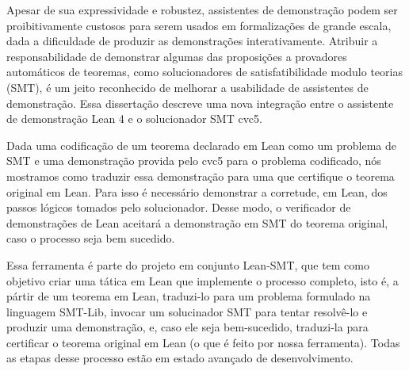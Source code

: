 Apesar de sua expressividade e robustez, assistentes
de demonstra\c{c}\~ao podem ser proibitivamente custosos
para serem usados em formaliza\c{c}\~oes de grande escala,
dada a dificuldade de produzir as demonstra\c{c}\~oes
interativamente.
%
Atribuir a responsabilidade de demonstrar algumas das
proposi\c{c}\~oes a provadores autom\'aticos de teoremas,
como solucionadores de satisfatibilidade modulo teorias (SMT),
\'e um jeito reconhecido de melhorar a usabilidade de
assistentes de demonstra\c{c}\~ao.
%
Essa disserta\c{c}\~ao descreve uma nova integra\c{c}\~ao
entre o assistente de demonstra\c{c}\~ao Lean 4 e o
solucionador SMT cvc5.

Dada uma codifica\c{c}\~ao de um teorema declarado em Lean como um
problema de SMT e uma demonstra\c{c}\~ao provida pelo cvc5 para
o problema codificado, n\'os mostramos como traduzir essa
demonstra\c{c}\~ao para uma que certifique o teorema original em
Lean.
%
Para isso \'e necess\'ario demonstrar a corretude, em Lean, dos
passos l\'ogicos tomados pelo solucionador. Desse modo, o
verificador de demonstra\c{c}\~oes de Lean aceitar\'a a
demonstra\c{c}\~ao em SMT do teorema original, caso o processo
seja bem sucedido.

Essa ferramenta \'e parte do projeto em conjunto Lean-SMT,
que tem como objetivo criar uma t\'atica em Lean que implemente
o processo completo, isto \'e, a p\'artir de um teorema em Lean,
traduzi-lo para um problema formulado na linguagem SMT-Lib,
invocar um solucinador SMT para tentar resolv\^e-lo e produzir
uma demonstra\c{c}\~ao, e, caso ele seja bem-sucedido,
traduzi-la para certificar o teorema original em Lean (o que
\'e feito por nossa ferramenta).
%
Todas as etapas desse processo est\~ao em estado
avan\c{c}ado de desenvolvimento.
